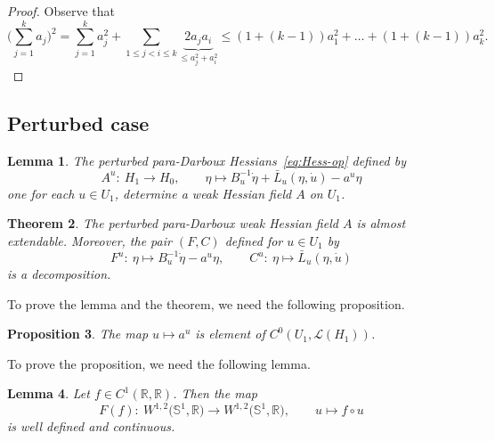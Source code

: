 \documentclass[pdftex]{sigma}
\numberwithin{equation}{section}
\newtheorem{Theorem}{Theorem}[section]
\newtheorem{Lemma}[Theorem]{Lemma}
\newtheorem{Proposition}[Theorem]{Proposition}
\newcommand{\R}{{\mathbb{R}}}
\renewcommand{\SS}{{\mathbb{S}}}
\newcommand{\Ll}{{\mathcal{L}}} %
\newcommand{\1}{{{\mathchoice {\rm 1\mskip-4mu l} {\rm 1\mskip-4mu l}
{\rm 1\mskip-4.5mu l} {\rm 1\mskip-5mu l}}}}
\begin{document}
\begin{proof}
Observe that
\[
 \Biggl(\sum_{j=1}^k a_j\Biggr)^2
 =\sum_{j=1}^k a_j^2
 +\sum_{1\le j<i\le k}\underbrace{2a_ja_i}_{\le a_j^2+a_i^2}
 \le(1+(k-1)) a_1^2+\dots+(1+(k-1)) a_k^2 .
\tag*{\qed}
\]
\renewcommand{\qed}{}
\end{proof}

\subsection{Perturbed case}

\begin{Lemma}\label{le:para-weak-pert}
The perturbed para-Darboux Hessians~\eqref{eq:Hess-op} defined by
\[
 A^u\colon\ H_1\to H_0 ,\qquad
 \eta\mapsto B_u^{-1}\dot \eta+\bar L_u(\eta,\dot u)-a^u\eta
\]
one for each $u\in U_1$,
determine a weak Hessian field $A$ on $U_1$.
\end{Lemma}

\begin{Theorem}\label{thm:paradarboux-Hess-pert}
The perturbed para-Darboux weak Hessian field $A$ is almost extendable.
Moreover, the pair $(F,C)$ defined for $u\in U_1$ by
\[
 F^u\colon\ \eta\mapsto B_u^{-1}\dot \eta - a^u\eta ,\qquad
 C^u\colon\ \eta\mapsto \bar L_u(\eta,\dot u)
\]
is a decomposition.
\end{Theorem}

To prove the lemma and the theorem, we need the following proposition.

\begin{Proposition}\label{prop:a^u-cont}
The map $u\mapsto a^u$ is element of $C^0(U_1,\Ll(H_1))$.
\end{Proposition}

To prove the proposition, we need the following lemma.

\begin{Lemma}\label{le:tech-cont}
Let $f\in C^1(\R,\R)$. Then the map
\[
 F(f)\colon\ W^{1,2}\bigl(\SS^1,\R\bigr)\to W^{1,2}\bigl(\SS^1,\R\bigr)
 ,\qquad
 u\mapsto f\circ u
\]
is well defined and continuous.
\end{Lemma}
\end{document}
